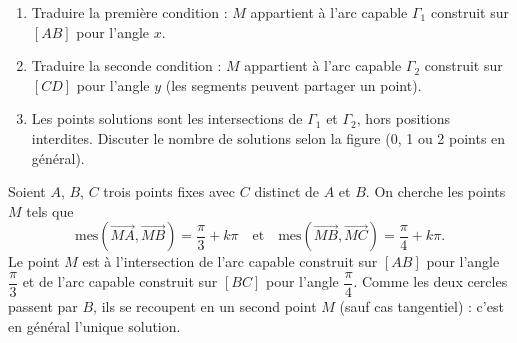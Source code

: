 \documentclass[11pt]{article}
\begin{document}
\begin{methode}
\begin{enumerate}
\item Traduire la première condition : $M$ appartient à l'arc capable $\Gamma_1$ construit sur $[AB]$ pour l'angle $x$.
\item Traduire la seconde condition : $M$ appartient à l'arc capable $\Gamma_2$ construit sur $[CD]$ pour l'angle $y$ (les segments peuvent partager un point).
\item Les points solutions sont les intersections de $\Gamma_1$ et $\Gamma_2$, hors positions interdites. Discuter le nombre de solutions selon la figure (0, 1 ou 2 points en général).
\end{enumerate}
\end{methode}

\begin{exemplebox}
Soient $A$, $B$, $C$ trois points fixes avec $C$ distinct de $A$ et $B$. On cherche les points $M$ tels que
\[ \text{mes}(\overrightarrow{MA},\overrightarrow{MB}) = \frac{\pi}{3} + k\pi \quad \text{et} \quad \text{mes}(\overrightarrow{MB},\overrightarrow{MC}) = \frac{\pi}{4} + k\pi. \]
Le point $M$ est à l'intersection de l'arc capable construit sur $[AB]$ pour l'angle $\dfrac{\pi}{3}$ et de l'arc capable construit sur $[BC]$ pour l'angle $\dfrac{\pi}{4}$. Comme les deux cercles passent par $B$, ils se recoupent en un second point $M$ (sauf cas tangentiel) : c'est en général l'unique solution.
\end{exemplebox}
\end{document}
